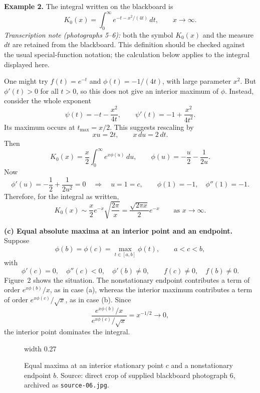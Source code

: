 \documentclass[11pt,a4paper]{article}
\begin{document}
\medskip
\noindent\textbf{Example 2.}
The integral written on the blackboard is
\[
    K_0(x)=\int_0^\infty e^{-t-x^2/(4t)}\,dt,
    \qquad x\to\infty.
\]
\emph{Transcription note (photographs 5--6):} both the symbol $K_0(x)$
and the measure $dt$ are retained from the blackboard. This definition
should be checked against the usual special-function notation; the
calculation below applies to the integral displayed here.

One might try $f(t)=e^{-t}$ and $\phi(t)=-1/(4t)$, with large parameter
$x^2$. But $\phi'(t)>0$ for all $t>0$, so this does not give an interior
maximum of $\phi$. Instead, consider the whole exponent
\[
    \psi(t)=-t-\frac{x^2}{4t},\qquad
    \psi'(t)=-1+\frac{x^2}{4t^2}.
\]
Its maximum occurs at $t_{\max}=x/2$. This suggests rescaling by
\[
    xu=2t,\qquad x\,du=2\,dt.
\]
Then
\[
    K_0(x)=\frac{x}{2}\int_0^\infty e^{x\phi(u)}\,du,
    \qquad \phi(u)=-\frac{u}{2}-\frac{1}{2u}.
\]
Now
\[
    \phi'(u)=-\frac12+\frac{1}{2u^2}=0
    \quad\Longrightarrow\quad u=1=c,
    \qquad \phi(1)=-1,\quad\phi''(1)=-1.
\]
Therefore, for the integral as written,
\[
    K_0(x)\sim\frac{x}{2}e^{-x}\sqrt{\frac{2\pi}{x}}
    =\frac{\sqrt{2\pi x}}{2}e^{-x}
    \qquad\text{as }x\to\infty.
\]

\medskip
\noindent\textbf{(c) Equal absolute maxima at an interior point and an endpoint.}
Suppose
\[
    \phi(b)=\phi(c)=\max_{t\in[a,b]}\phi(t),\qquad a<c<b,
\]
with
\[
    \phi'(c)=0,\quad\phi''(c)<0,\quad\phi'(b)\neq0,
    \qquad f(c)\neq0,\quad f(b)\neq0.
\]
Figure~2 shows the situation.
The nonstationary endpoint contributes a term of order
$e^{x\phi(b)}/x$, as in case (a), whereas the interior maximum contributes
a term of order $e^{x\phi(c)}/\sqrt{x}$, as in case (b). Since
\[
    \frac{e^{x\phi(b)}/x}{e^{x\phi(c)}/\sqrt{x}}
    =x^{-1/2}\to0,
\]
the interior point dominates the integral.
\begin{figure}[htbp]
    \centering
    \pdfximage width 0.27\linewidth {figures/asymptotic-lecture6/interior-and-endpoint.jpg}
    \pdfrefximage\pdflastximage
    \caption{Equal maxima at an interior stationary point $c$ and a
    nonstationary endpoint $b$. Source: direct crop of supplied blackboard
    photograph 6, archived as \texttt{source-06.jpg}.}
    \label{fig:am-lecture6-interior-endpoint}
\end{figure}
\end{document}
